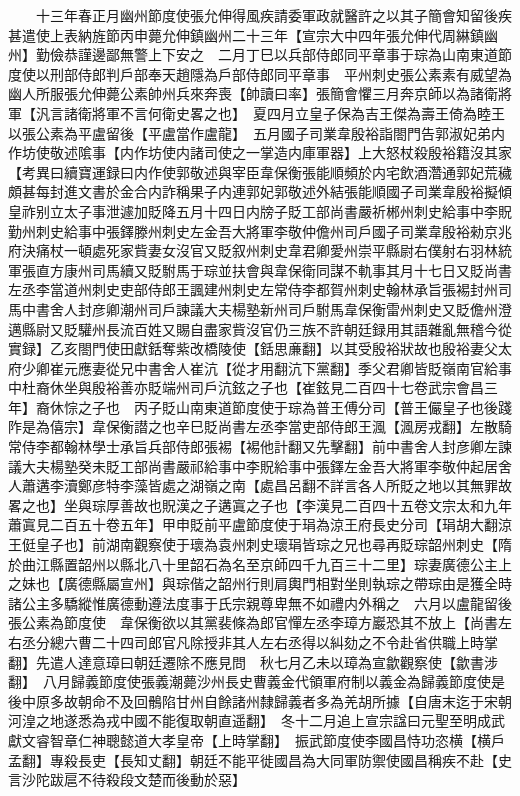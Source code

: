　　十三年春正月幽州節度使張允伸得風疾請委軍政就醫許之以其子簡會知留後疾甚遣使上表納旌節丙申薨允伸鎮幽州二十三年【宣宗大中四年張允伸代周綝鎮幽州】勤儉恭謹邊鄙無警上下安之　二月丁巳以兵部侍郎同平章事于琮為山南東道節度使以刑部侍郎判戶部奉天趙隱為戶部侍郎同平章事　平州刺史張公素素有威望為幽人所服張允伸薨公素帥州兵來奔喪【帥讀曰率】張簡會懼三月奔京師以為諸衛將軍【汎言諸衛將軍不言何衛史畧之也】　夏四月立皇子保為吉王傑為壽王倚為睦王　以張公素為平盧留後【平盧當作盧龍】　五月國子司業韋殷裕詣閤門告郭淑妃弟内作坊使敬述隂事【内作坊使内諸司使之一掌造内庫軍器】上大怒杖殺殷裕籍沒其家　【考異曰續寶運録曰内作使郭敬述與宰臣韋保衡張能順頻於内宅飲酒濳通郭妃荒穢頗甚每封進文書於金合内詐稱果子内連郭妃郭敬述外結張能順國子司業韋殷裕擬傾皇祚别立太子事泄遽加貶降五月十四日内牓子貶工部尚書嚴祈郴州刺史給事中李貺勤州刺史給事中張鐸滕州刺史左金吾大將軍李敬仲儋州司戶國子司業韋殷裕勑京兆府決痛杖一頓處死家貲妻女沒官又貶叙州刺史韋君卿愛州崇平縣尉右僕射右羽林統軍張直方康州司馬續又貶駙馬于琮並扶會與韋保衛同謀不軌事其月十七日又貶尚書左丞李當道州刺史吏部侍郎王諷建州刺史左常侍李都賀州刺史翰林承旨張裼封州司馬中書舍人封彦卿潮州司戶諫議大夫楊塾新州司戶駙馬韋保衡雷州刺史又貶儋州澄邁縣尉又貶驩州長流百姓又賜自盡家貲沒官仍三族不許朝廷録用其語雜亂無稽今從實録】乙亥閤門使田獻銛奪紫改橋陵使【銛思亷翻】以其受殷裕狀故也殷裕妻父太府少卿崔元應妻從兄中書舍人崔沆【從才用翻沆下黨翻】季父君卿皆貶嶺南官給事中杜裔休坐與殷裕善亦貶端州司戶沆鉉之子也【崔鉉見二百四十七卷武宗會昌三年】裔休悰之子也　丙子貶山南東道節度使于琮為普王傅分司【普王儼皇子也後踐阼是為僖宗】韋保衡譛之也辛巳貶尚書左丞李當吏部侍郎王渢【渢房戎翻】左散騎常侍李都翰林學士承旨兵部侍郎張裼【裼他計翻又先擊翻】前中書舍人封彦卿左諫議大夫楊塾癸未貶工部尚書嚴祁給事中李貺給事中張鐸左金吾大將軍李敬仲起居舍人蕭遘李瀆鄭彦特李藻皆處之湖嶺之南【處昌呂翻不詳言各人所貶之地以其無罪故畧之也】坐與琮厚善故也貺漢之子遘寘之子也【李漢見二百四十五卷文宗太和九年蕭寘見二百五十卷五年】甲申貶前平盧節度使于琄為涼王府長史分司【琄胡大翻涼王侹皇子也】前湖南觀察使于瓌為袁州刺史瓌琄皆琮之兄也尋再貶琮韶州刺史【隋於曲江縣置韶州以縣北八十里韶石為名至京師四千九百三十二里】琮妻廣德公主上之妹也【廣德縣屬宣州】與琮偕之韶州行則肩輿門相對坐則執琮之帶琮由是獲全時諸公主多驕縱惟廣德動遵法度事于氏宗親尊卑無不如禮内外稱之　六月以盧龍留後張公素為節度使　韋保衡欲以其黨裴條為郎官憚左丞李璋方巖恐其不放上【尚書左右丞分總六曹二十四司郎官凡除授非其人左右丞得以糾劾之不令赴省供職上時掌翻】先遣人達意璋曰朝廷遷除不應見問　秋七月乙未以璋為宣歙觀察使【歙書涉翻】　八月歸義節度使張義潮薨沙州長史曹義金代領軍府制以義金為歸義節度使是後中原多故朝命不及回鶻陷甘州自餘諸州隸歸義者多為羌胡所據【自唐末迄于宋朝河湟之地遂悉為戎中國不能復取朝直遥翻】　冬十二月追上宣宗諡曰元聖至明成武獻文睿智章仁神聰懿道大孝皇帝【上時掌翻】　振武節度使李國昌恃功恣横【横戶孟翻】專殺長吏【長知丈翻】朝廷不能平徙國昌為大同軍防禦使國昌稱疾不赴【史言沙陀跋扈不待殺段文楚而後動於惡】

